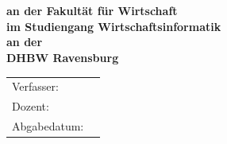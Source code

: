 \begin{titlepage}
	\begin{center}
		\vspace*{2cm}
		\LARGE\bf\myTopic\\
		\vspace*{3cm}
		\bf
		\myVorlesung\\
		\normalsize\rm
		\vspace*{1cm}
		\vspace*{1cm}
		an der Fakultät für Wirtschaft\\
		im Studiengang Wirtschaftsinformatik\\
		\vspace*{1cm}
		an der\\
		DHBW Ravensburg
		\vfill
	\end{center}
	\begin{tabular}{ll}
		Verfasser:&\myAutor\\
		Dozent:&\myProf\\
		Abgabedatum:&\myEndDate\\
	\end{tabular}
\end{titlepage}
\newpage
\setcounter{page}{2}
